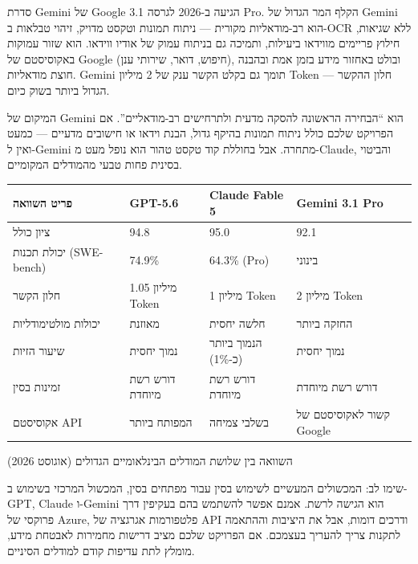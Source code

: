 
סדרת Gemini של Google הגיעה ב-2026 לגרסה 3.1 Pro. הקלף המר הגדול של Gemini הוא רב-מודאליות מקורית — ניתוח תמונות וטקסט מדויק, זיהוי טבלאות ב-OCR ללא שגיאות, חילוץ פריימים מווידאו ביעילות, ותמיכה גם בניתוח עמוק של אודיו ווידאו. הוא שזור עמוקות באקוסיסטם של Google (חיפוש, דואר, שירותי ענן), ובולט באחזור מידע בזמן אמת ובהבנה חוצת מודאליות. Gemini תומך גם בקלט הקשר ענק של 2 מיליון Token — חלון ההקשר הגדול ביותר בשוק כיום.

המיקום של Gemini הוא “הבחירה הראשונה להסקה מדעית ולתרחישים רב-מודאליים”. אם הפרויקט שלכם כולל ניתוח תמונות בהיקף גדול, הבנת וידאו או חישובים מדעיים — כמעט ואין ל-Gemini מתחרה. אבל בחוללת קוד טקסט טהור הוא נופל מעט מ-Claude, והביטוי בסינית פחות טבעי מהמודלים המקומיים.

\begin{center}
\begin{tabularx}{\linewidth}{|X|X|X|X|}
\hline
\textbf{פריט השוואה} & \textbf{GPT-5.6} & \textbf{Claude Fable 5} & \textbf{Gemini 3.1 Pro} \tabularnewline
\hline
ציון כולל & 94.8 & 95.0 & 92.1 \tabularnewline
יכולת תכנות (SWE-bench) & 74.9\% & 64.3\% (Pro) & בינוני \tabularnewline
חלון הקשר & 1.05 מיליון Token & 1 מיליון Token & 2 מיליון Token \tabularnewline
יכולות מולטימודליות & מאוזנת & חלשה יחסית & החזקה ביותר \tabularnewline
שיעור הזיות & נמוך יחסית & הנמוך ביותר (כ-1\%) & נמוך יחסית \tabularnewline
זמינות בסין & דורש רשת מיוחדת & דורש רשת מיוחדת & דורש רשת מיוחדת \tabularnewline
אקוסיסטם API & המפותח ביותר & בשלבי צמיחה & קשור לאקוסיסטם של Google \tabularnewline
\hline
\end{tabularx}
\end{center}

\begin{center}\small\color{gray}השוואה בין שלושת המודלים הבינלאומיים הגדולים (אוגוסט 2026)\end{center}

\begin{tcbwarn}{שימו לב: המכשולים המעשיים לשימוש בסין}
עבור מפתחים בסין, המכשול המרכזי בשימוש ב-GPT, Claude ו-Gemini הוא הגישה לרשת. אמנם אפשר להשתמש בהם בעקיפין דרך פרוקסי של Azure, פלטפורמות אגרגציה של API ודרכים דומות, אבל את היציבות וההתאמה לתקנות צריך להעריך בעצמכם. אם הפרויקט שלכם מציב דרישות מחמירות לאבטחת מידע, מומלץ לתת עדיפות קודם למודלים הסיניים.

\end{tcbwarn}


